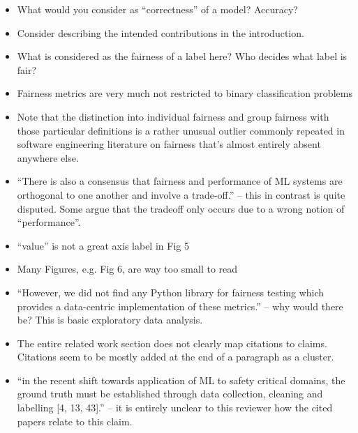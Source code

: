 \documentclass[conference]{IEEEtran}
\newcommand{\highlight}[1]{\begin{framed}%
  \noindent\emph{#1}
\end{framed}}
\begin{document}
\begin{itemize}
    (rather than methods) to be exploratory
  \item What would you consider as ``correctness'' of a model?
    Accuracy?
  \item Consider describing the intended contributions in the
    introduction.
  \item What is considered as the fairness of a label here? Who
    decides what label is fair?
  \item Fairness metrics are very much not restricted to binary
    classification problems
  \item Note that the distinction into individual fairness and group
    fairness with those particular definitions is a rather unusual
    outlier commonly repeated in software engineering literature on
    fairness that’s almost entirely absent anywhere else.
  \item ``There is also a consensus that fairness and performance of
    ML systems are orthogonal to one another and involve
    a trade-off.'' -- this in contrast is quite disputed. Some argue
    that the tradeoff only occurs due to a wrong notion of
    ``performance''.
  \item ``value'' is not a great axis label in Fig 5
  \item Many Figures, e.g. Fig 6, are way too small to read
  \item ``However, we did not find any Python library for fairness
    testing which provides a data-centric implementation of these
    metrics.'' -- why would there be? This is basic exploratory data
    analysis.


  \item The entire related work section does not clearly map citations
    to claims. Citations seem to be mostly added at the end of
    a paragraph as a cluster.
  \item ``in the recent shift towards application of ML to safety
    critical domains, the ground truth must be established through
    data collection, cleaning and labelling [4, 13, 43].'' -- it is
    entirely unclear to this reviewer how the cited papers relate to
    this claim.


\end{itemize}
\end{document}
